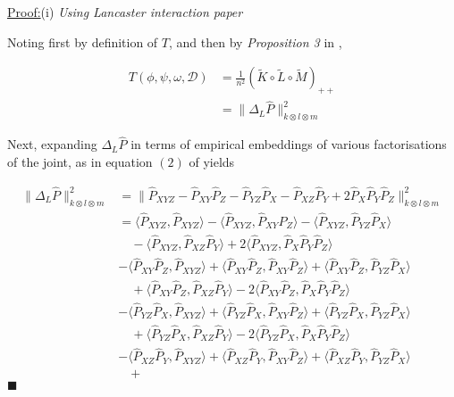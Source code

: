 \documentclass[12pt]{article}
\newenvironment{claimproof}[1]{\par\noindent\underline{Proof:}\space#1}{\hfill $\blacksquare$}
\numberwithin{claim}{section}
\numberwithin{lemma}{section}
\numberwithin{theorem}{section}
\begin{document}
\begin{claimproof}(i) \emph{Using Lancaster interaction paper}

Noting first by definition of $T$, and then by \emph{Proposition 3} in \cite{sejdinovic2013kernel},

\begin{align*}
T(\phi,\psi,\omega,\mathcal{D}) & = \frac{1}{n^2}(\tilde{K} \circ \tilde{L}\circ \tilde{M})_{++}\\
& = \| \Delta_L \hat{P} \|_{k\otimes l \otimes m}^2
\end{align*}


Next, expanding  $ \Delta_L \hat{P}$ in terms of empirical embeddings of various factorisations of the joint, as in equation $(2)$ of \cite{sejdinovic2013kernel} yields

\begin{align*}
\| \Delta_L \hat{P} \|_{k\otimes l \otimes m}^2 &= \| \hat{P}_{XYZ} - \hat{P}_{XY}\hat{P}_{Z} - \hat{P}_{YZ}\hat{P}_{X} - \hat{P}_{XZ}\hat{P}_{Y} + 2\hat{P}_{X}\hat{P}_{Y}\hat{P}_{Z}\|_{k\otimes l \otimes m}^2 \\
& = 
\langle \hat{P}_{XYZ} , \hat{P}_{XYZ} \rangle - 
\langle \hat{P}_{XYZ} , \hat{P}_{XY}\hat{P}_{Z}\rangle - 
\langle \hat{P}_{XYZ} , \hat{P}_{YZ}\hat{P}_{X} \rangle \\ & \quad- 
\langle \hat{P}_{XYZ} , \hat{P}_{XZ}\hat{P}_{Y}\rangle +
2 \langle \hat{P}_{XYZ} ,\hat{P}_{X}\hat{P}_{Y}\hat{P}_{Z} \rangle \\& -
\langle \hat{P}_{XY}\hat{P}_{Z} , \hat{P}_{XYZ} \rangle +
\langle \hat{P}_{XY}\hat{P}_{Z} , \hat{P}_{XY}\hat{P}_{Z}\rangle + 
\langle \hat{P}_{XY}\hat{P}_{Z} , \hat{P}_{YZ}\hat{P}_{X} \rangle \\ & \quad + 
\langle \hat{P}_{XY}\hat{P}_{Z} , \hat{P}_{XZ}\hat{P}_{Y}\rangle -
2 \langle \hat{P}_{XY}\hat{P}_{Z} ,\hat{P}_{X}\hat{P}_{Y}\hat{P}_{Z} \rangle \\& -
\langle \hat{P}_{YZ}\hat{P}_{X} , \hat{P}_{XYZ} \rangle + 
\langle \hat{P}_{YZ}\hat{P}_{X} , \hat{P}_{XY}\hat{P}_{Z}\rangle + 
\langle \hat{P}_{YZ}\hat{P}_{X} , \hat{P}_{YZ}\hat{P}_{X} \rangle \\ & \quad +
\langle \hat{P}_{YZ}\hat{P}_{X} , \hat{P}_{XZ}\hat{P}_{Y}\rangle -
2 \langle \hat{P}_{YZ}\hat{P}_{X} ,\hat{P}_{X}\hat{P}_{Y}\hat{P}_{Z} \rangle \\& -
\langle \hat{P}_{XZ}\hat{P}_{Y} , \hat{P}_{XYZ} \rangle + 
\langle \hat{P}_{XZ}\hat{P}_{Y} , \hat{P}_{XY}\hat{P}_{Z}\rangle +
\langle \hat{P}_{XZ}\hat{P}_{Y} , \hat{P}_{YZ}\hat{P}_{X} \rangle \\ & \quad + 

\end{align*}
\end{claimproof}
\end{document}
